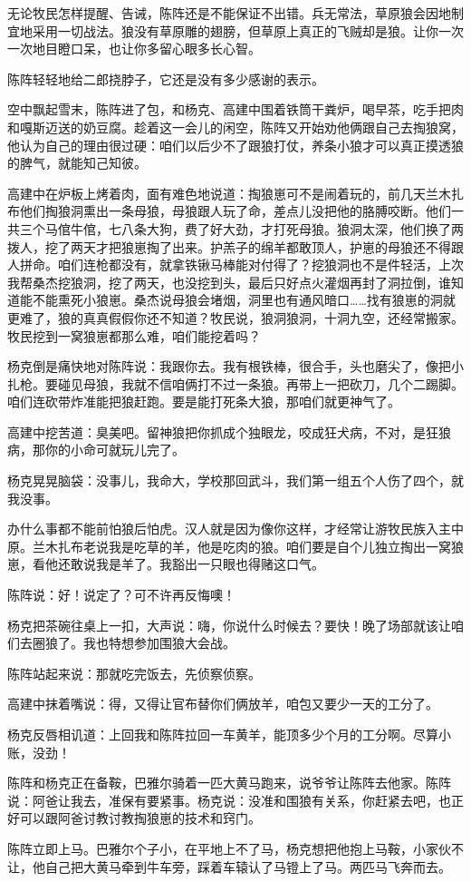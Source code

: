 \par 无论牧民怎样提醒、告诫，陈阵还是不能保证不出错。兵无常法，草原狼会因地制宜地采用一切战法。狼没有草原雕的翅膀，但草原上真正的飞贼却是狼。让你一次一次地目瞪口呆，也让你多留心眼多长心智。
\par 陈阵轻轻地给二郎挠脖子，它还是没有多少感谢的表示。
\par 空中飘起雪末，陈阵进了包，和杨克、高建中围着铁筒干粪炉，喝早茶，吃手把肉和嘎斯迈送的奶豆腐。趁着这一会儿的闲空，陈阵又开始劝他俩跟自己去掏狼窝，他认为自己的理由很过硬：咱们以后少不了跟狼打仗，养条小狼才可以真正摸透狼的脾气，就能知己知彼。
\par 高建中在炉板上烤着肉，面有难色地说道：掏狼崽可不是闹着玩的，前几天兰木扎布他们掏狼洞熏出一条母狼，母狼跟人玩了命，差点儿没把他的胳膊咬断。他们一共三个马倌牛倌，七八条大狗，费了好大劲，才打死母狼。狼洞太深，他们换了两拨人，挖了两天才把狼崽掏了出来。护羔子的绵羊都敢顶人，护崽的母狼还不得跟人拼命。咱们连枪都没有，就拿铁锹马棒能对付得了？挖狼洞也不是件轻活，上次我帮桑杰挖狼洞，挖了两天，也没挖到头，最后只好点火灌烟再封了洞拉倒，谁知道能不能熏死小狼崽。桑杰说母狼会堵烟，洞里也有通风暗口……找有狼崽的洞就更难了，狼的真真假假你还不知道？牧民说，狼洞狼洞，十洞九空，还经常搬家。牧民挖到一窝狼崽都那么难，咱们能挖着吗？
\par 杨克倒是痛快地对陈阵说：我跟你去。我有根铁棒，很合手，头也磨尖了，像把小扎枪。要碰见母狼，我就不信咱俩打不过一条狼。再带上一把砍刀，几个二踢脚。咱们连砍带炸准能把狼赶跑。要是能打死条大狼，那咱们就更神气了。
\par 高建中挖苦道：臭美吧。留神狼把你抓成个独眼龙，咬成狂犬病，不对，是狂狼病，那你的小命可就玩儿完了。
\par 杨克晃晃脑袋：没事儿，我命大，学校那回武斗，我们第一组五个人伤了四个，就我没事。
\par 办什么事都不能前怕狼后怕虎。汉人就是因为像你这样，才经常让游牧民族入主中原。兰木扎布老说我是吃草的羊，他是吃肉的狼。咱们要是自个儿独立掏出一窝狼崽，看他还敢说我是羊了。我豁出一只眼也得赌这口气。
\par 陈阵说：好！说定了？可不许再反悔噢！
\par 杨克把茶碗往桌上一扣，大声说：嗨，你说什么时候去？要快！晚了场部就该让咱们去圈狼了。我也特想参加围狼大会战。
\par 陈阵站起来说：那就吃完饭去，先侦察侦察。
\par 高建中抹着嘴说：得，又得让官布替你们俩放羊，咱包又要少一天的工分了。
\par 杨克反唇相讥道：上回我和陈阵拉回一车黄羊，能顶多少个月的工分啊。尽算小账，没劲！
\par 陈阵和杨克正在备鞍，巴雅尔骑着一匹大黄马跑来，说爷爷让陈阵去他家。陈阵说：阿爸让我去，准保有要紧事。杨克说：没准和围狼有关系，你赶紧去吧，也正好可以跟阿爸讨教讨教掏狼崽的技术和窍门。
\par 陈阵立即上马。巴雅尔个子小，在平地上不了马，杨克想把他抱上马鞍，小家伙不让，他自己把大黄马牵到牛车旁，踩着车辕认了马镫上了马。两匹马飞奔而去。




